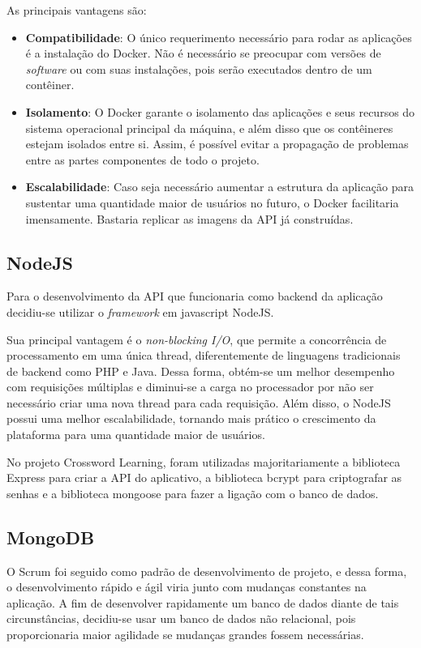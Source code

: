 As principais vantagens são:

\begin{itemize}
    \item \textbf{Compatibilidade}: O único requerimento necessário para rodar as aplicações é a instalação do Docker. Não é necessário se preocupar com versões de \textit{software} ou com suas instalações, pois serão executados dentro de um contêiner.
    
    \item \textbf{Isolamento}: O Docker garante o isolamento das aplicações e seus recursos do sistema operacional principal da máquina, e além disso que os contêineres estejam isolados entre si. Assim, é possível evitar a propagação de problemas entre as partes componentes de todo o projeto.
    
    \item \textbf{Escalabilidade}: Caso seja necessário aumentar a estrutura da aplicação para sustentar uma quantidade maior de usuários no futuro, o Docker facilitaria imensamente. Bastaria replicar as imagens da API já construídas.
\end{itemize}


\subsection{NodeJS}
Para o desenvolvimento da API que funcionaria como backend da aplicação decidiu-se utilizar o \textit{framework} em javascript NodeJS. 

Sua principal vantagem é o \textit{non-blocking I/O}, que permite a concorrência
de processamento em uma única thread, diferentemente de linguagens tradicionais de backend como PHP e Java. Dessa forma, obtém-se um melhor desempenho com requisições múltiplas e diminui-se a carga no processador por não ser necessário criar uma nova thread para cada requisição. Além disso, o NodeJS possui uma melhor escalabilidade,
tornando mais prático o crescimento da plataforma para uma quantidade maior de usuários.

No projeto Crossword Learning, foram utilizadas majoritariamente a biblioteca Express para criar a API do aplicativo, a biblioteca bcrypt para criptografar as senhas e a biblioteca mongoose para fazer a ligação com o banco de dados.

\subsection{MongoDB}
O Scrum foi seguido como padrão de desenvolvimento de projeto, e dessa forma, o desenvolvimento rápido e ágil viria junto com mudanças constantes na aplicação.
A fim de desenvolver rapidamente um banco de dados diante de tais circunstâncias, decidiu-se usar um banco de dados não relacional, pois proporcionaria maior agilidade se mudanças grandes fossem necessárias.

